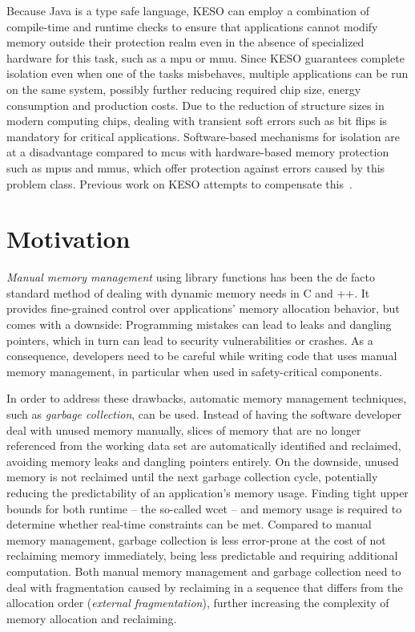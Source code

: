 		Because Java is a type safe language, KESO can employ a combination of compile-time and runtime checks to ensure
		that applications cannot modify memory outside their protection realm even in the absence of specialized hardware
		for this task, such as a \gls{mpu} or \gls{mmu}. Since KESO guarantees complete isolation even when one of the tasks
		misbehaves, multiple applications can be run on the same system, possibly further reducing required chip size,
		energy consumption and production costs. Due to the reduction of structure sizes in modern computing chips, dealing
		with transient soft errors such as bit flips is mandatory for critical applications. Software-based mechanisms for
		isolation are at a disadvantage compared to \glspl{mcu} with hardware-based memory protection such as \glspl{mpu}
		and \glspl{mmu}, which offer protection against errors caused by this problem class. Previous work on KESO attempts
		to compensate this~\cite{thomm:11:jtres, stilkerich:13:lctes}.

	\section{Motivation}
		\label{sec:intro:motivation}

		\emph{Manual memory management} using library functions has been the de facto standard method of dealing with
		dynamic memory needs in C and \C++{}. It provides fine-grained control over applications' memory allocation
		behavior, but comes with a downside: Programming mistakes can lead to leaks and dangling pointers, which in turn can
		lead to security vulnerabilities or crashes. As a consequence, developers need to be careful while writing code that
		uses manual memory management, in particular when used in safety-critical components.

		In order to address these drawbacks, automatic memory management techniques, such as \emph{garbage collection}, can
		be used. Instead of having the software developer deal with unused memory manually, slices of memory that are no
		longer referenced from the working data set are automatically identified and reclaimed, avoiding memory leaks and
		dangling pointers entirely. On the downside, unused memory is not reclaimed until the next garbage collection cycle,
		potentially reducing the predictability of an application's memory usage. Finding tight upper bounds for both
		runtime – the so-called \gls{wcet} – and memory usage is required to determine whether real-time constraints can be
		met. Compared to manual memory management, garbage collection is less error-prone at the cost of not reclaiming
		memory immediately, being less predictable and requiring additional computation. Both manual memory management and
		garbage collection need to deal with fragmentation caused by reclaiming in a sequence that differs from the
		allocation order (\emph{external fragmentation}), further increasing the complexity of memory allocation and
		reclaiming.

